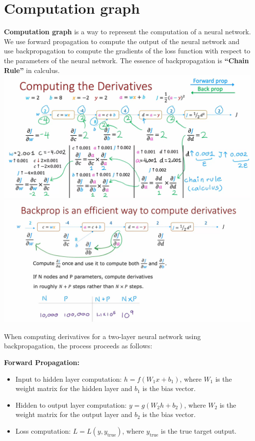 \section{Computation graph}
\textbf{Computation graph} is a way to represent the computation of a neural network.
We use forward propagation to compute the output of the neural network and use backpropagation to compute the gradients of the loss function with respect to the parameters of the neural network.
The essence of backpropagation is \textbf{``Chain Rule''} in calculus.\\
\includegraphics*[width=\textwidth]{images/9.4}
\includegraphics*[width=\textwidth]{images/9.5}
\par

When computing derivatives for a two-layer neural network using backpropagation, the process proceeds as follows:

\textbf{Forward Propagation:}
\begin{itemize}
   \item Input to hidden layer computation: \( h = f(W_1 x + b_1) \), where \( W_1 \) is the weight matrix for the hidden layer and \( b_1 \) is the bias vector.
   \item Hidden to output layer computation: \( y = g(W_2 h + b_2) \), where \( W_2 \) is the weight matrix for the output layer and \( b_2 \) is the bias vector.
   \item Loss computation: \( L = L(y, y_{\text{true}}) \), where \( y_{\text{true}} \) is the true target output.
\end{itemize}

